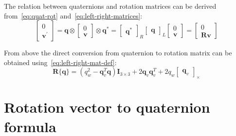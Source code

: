 The relation between quaternions and rotation matrices can be derived from~\eqref{eq:quat-rot} and~\eqref{eq:left-right-matrices}:
\begin{equation}
    \begin{bmatrix}
        0 \\ 
        \mathbf{v}^{'}
    \end{bmatrix}=\mathbf{q}\otimes\begin{bmatrix}
        0 \\ 
        \mathbf{v}
    \end{bmatrix}\otimes\mathbf{q}^*=\begin{bmatrix}\mathbf{q}^*\end{bmatrix}_R\begin{bmatrix}\mathbf{q}\end{bmatrix}_L\begin{bmatrix}
        0 \\ \mathbf{v}\end{bmatrix}=\begin{bmatrix}
            0\\ \mathbf{R}\mathbf{v}
        \end{bmatrix}
\label{eq:quat-rotmat-relation}
\end{equation}

From above the direct conversion from quaternion to rotation matrix can be obtained using~\eqref{eq:left-right-mat-def}:
\begin{equation}
    \mathbf{R}\{\mathbf{q}\}=(q_w^2-\mathbf{q}_v^T\mathbf{q})\mathbf{I}_{3\times 3}+2\mathbf{q}_v\mathbf{q}_v^T+2q_w\begin{bmatrix}
        \mathbf{q}_v\end{bmatrix}_\times
\label{eq:quat2rotmat}
\end{equation}

\section{Rotation vector to quaternion formula}\label{app:rotvec2quat}

